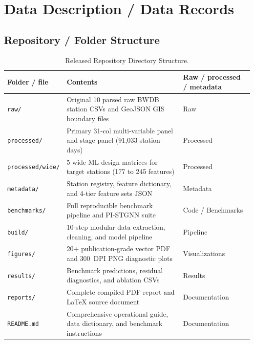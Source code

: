 \documentclass[11pt,a4paper]{article}
\begin{document}
\section{Data Description / Data Records}

\subsection{Repository / Folder Structure}
\begin{table}[htbp]\centering\small
\caption{Released Repository Directory Structure.}
\label{tab:folder_structure}
\begin{tabularx}{\linewidth}{|l|X|l|}
\hline
\rowcolor{wordheadbg} \textbf{Folder / file} & \textbf{Contents} & \textbf{Raw / processed / metadata} \\ \hline
\texttt{raw/} & Original 10 parsed raw BWDB station CSVs and GeoJSON GIS boundary files & Raw \\ \hline
\texttt{processed/} & Primary 31-col multi-variable panel and stage panel (91,033 station-days) & Processed \\ \hline
\texttt{processed/wide/} & 5 wide ML design matrices for target stations (177 to 245 features) & Processed \\ \hline
\texttt{metadata/} & Station registry, feature dictionary, and 4-tier feature sets JSON & Metadata \\ \hline
\texttt{benchmarks/} & Full reproducible benchmark pipeline and PI-STGNN suite & Code / Benchmarks \\ \hline
\texttt{build/} & 10-step modular data extraction, cleaning, and model pipeline & Pipeline \\ \hline
\texttt{figures/} & 20+ publication-grade vector PDF and 300~DPI PNG diagnostic plots & Visualizations \\ \hline
\texttt{results/} & Benchmark predictions, residual diagnostics, and ablation CSVs & Results \\ \hline
\texttt{reports/} & Complete compiled PDF report and LaTeX source document & Documentation \\ \hline
\texttt{README.md} & Comprehensive operational guide, data dictionary, and benchmark instructions & Documentation \\ \hline
\end{tabularx}
\end{table}
\end{document}
